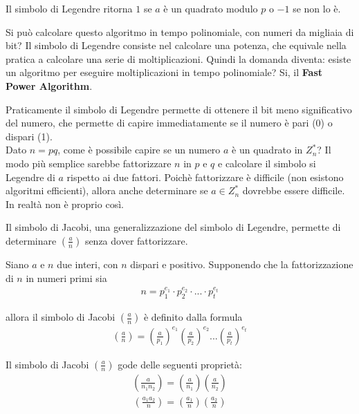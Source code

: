 \noindent Il simbolo di Legendre ritorna $1$ se $a$ è un quadrato modulo $p$ o $-1$ se non lo è. 

Si può calcolare questo algoritmo in tempo polinomiale, con numeri da migliaia di bit? Il simbolo di Legendre consiste nel calcolare una potenza, che equivale nella pratica a calcolare una serie di moltiplicazioni. Quindi la domanda diventa: esiste un algoritmo per eseguire moltiplicazioni in tempo polinomiale? Si, il \textbf{Fast Power Algorithm}. 

Praticamente il simbolo di Legendre permette di ottenere il bit meno significativo del numero, che permette di capire immediatamente se il numero è pari (0) o dispari (1).\\

\noindent Dato $n=pq$, come è possibile capire se un numero $a$ è un quadrato in $Z_n^*$? Il modo più semplice sarebbe fattorizzare $n$ in $p$ e $q$ e calcolare il simbolo si Legendre di $a$ rispetto ai due fattori. Poichè fattorizzare è difficile (non esistono algoritmi efficienti), allora anche determinare se $a \in Z_n^*$ dovrebbe essere difficile. In realtà non è proprio così. 

Il simbolo di Jacobi, una generalizzazione del simbolo di Legendre, permette di determinare $\left(\frac{a}{n} \right)$ senza dover fattorizzare.
\begin{definition} Siano \(a\) e \(n\) due interi, con \(n\) dispari e positivo. Supponendo che la fattorizzazione di \(n\) in numeri primi sia 
\begin{align*}
    n = p_1^{e_1} \cdot p_2^{e_2} \cdot ... \cdot p_t^{e_t}
\end{align*}

\noindent allora il simbolo di Jacobi \(\left(\frac{a}{n}\right)\) è definito dalla formula 
\begin{align*}
    \left(\frac{a}{n}\right) = \left(\frac{a}{p_1}\right)^{e_1} \left(\frac{a}{p_2}\right)^{e_2} ... \left(\frac{a}{p_t}\right)^{e_t}
\end{align*}
\end{definition}

\noindent Il simbolo di Jacobi $\left(\frac{a}{n}\right)$ gode delle seguenti proprietà:
\begin{align*}
    \left(\frac{a}{n_1n_2}\right) = \left(\frac{a}{n_1}\right)\left(\frac{a}{n_2}\right)
\end{align*}
\begin{align*}
        \left(\frac{a_1a_2}{n}\right) = \left(\frac{a_1}{n}\right)\left(\frac{a_2}{n}\right)
\end{align*}

